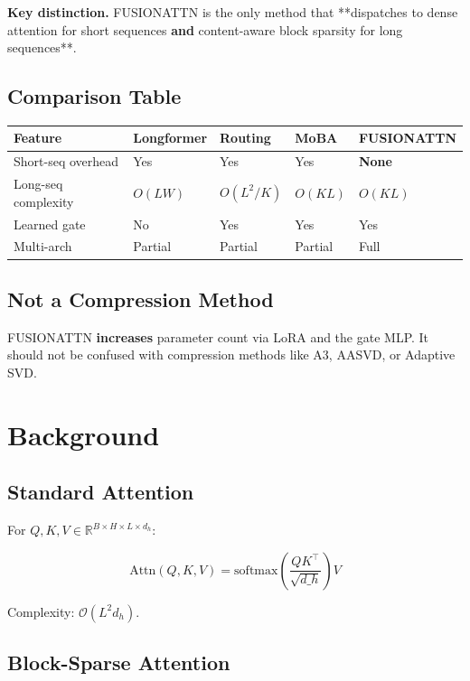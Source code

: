 \textbf{Key distinction.} FUSIONATTN is the only method that **dispatches to 
dense attention for short sequences\textbf{ and }content-aware block sparsity 
for long sequences**.

\subsection{Comparison Table}

\begin{table}[H]
\centering
\small
\begin{tabular}{lllll}
\toprule
\textbf{Feature} & \textbf{Longformer} & \textbf{Routing} & \textbf{MoBA} & \textbf{FUSIONATTN} \\
\midrule
Short-seq overhead & Yes & Yes & Yes & \textbf{None} \\
Long-seq complexity & $O(LW)$ & $O(L^2/K)$ & $O(KL)$ & $O(KL)$ \\
Learned gate & No & Yes & Yes & Yes \\
Multi-arch & Partial & Partial & Partial & Full \\
\bottomrule
\end{tabular}
\end{table}

\subsection{Not a Compression Method}

FUSIONATTN \textbf{increases} parameter count via LoRA and the gate MLP. It 
should not be confused with compression methods like A3, AASVD, or 
Adaptive SVD.



\section{Background}

\subsection{Standard Attention}

For $Q, K, V \in \mathbb{R}^{B \times H \times L \times d_h}$:

\[
\text{Attn}(Q, K, V) = \text{softmax}\!\left(\frac{Q K^\top}{\sqrt{d\_h}}\right) V
\tag{3.1}
\]

Complexity: $\mathcal{O}(L^2 d_h)$.

\subsection{Block-Sparse Attention}

